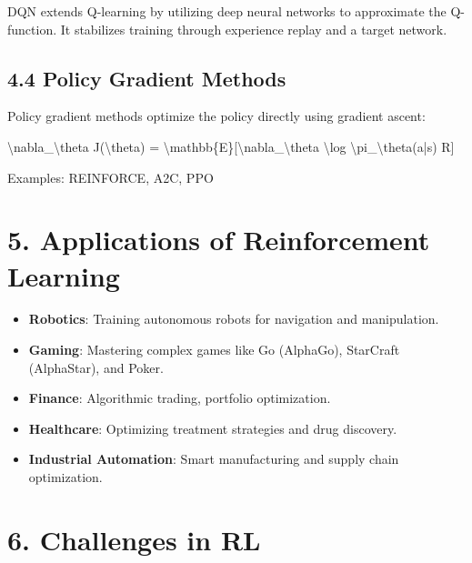 \documentclass[
]{book}
\newenvironment{Shaded}{\begin{snugshade}}{\end{snugshade}}
\newcommand{\NormalTok}[1]{#1}
\providecommand{\tightlist}{%
  \setlength{\itemsep}{0pt}\setlength{\parskip}{0pt}}
\begin{document}
DQN extends Q-learning by utilizing deep neural networks to approximate the Q-function. It stabilizes training through experience replay and a target network.

\subsection{\texorpdfstring{\textbf{4.4 Policy Gradient Methods}}{4.4 Policy Gradient Methods}}\label{policy-gradient-methods}

Policy gradient methods optimize the policy directly using gradient ascent:

\begin{Shaded}
\begin{Highlighting}[]
\NormalTok{\textbackslash{}nabla\_\textbackslash{}theta J(\textbackslash{}theta) = \textbackslash{}mathbb\{E\}[\textbackslash{}nabla\_\textbackslash{}theta \textbackslash{}log \textbackslash{}pi\_\textbackslash{}theta(a|s) R]}
\end{Highlighting}
\end{Shaded}

Examples: REINFORCE, A2C, PPO

\section{\texorpdfstring{\textbf{5. Applications of Reinforcement Learning}}{5. Applications of Reinforcement Learning}}\label{applications-of-reinforcement-learning}

\begin{itemize}
\tightlist
\item
  \textbf{Robotics}: Training autonomous robots for navigation and manipulation.
\item
  \textbf{Gaming}: Mastering complex games like Go (AlphaGo), StarCraft (AlphaStar), and Poker.
\item
  \textbf{Finance}: Algorithmic trading, portfolio optimization.
\item
  \textbf{Healthcare}: Optimizing treatment strategies and drug discovery.
\item
  \textbf{Industrial Automation}: Smart manufacturing and supply chain optimization.
\end{itemize}

\section{\texorpdfstring{\textbf{6. Challenges in RL}}{6. Challenges in RL}}\label{challenges-in-rl}
\end{document}
